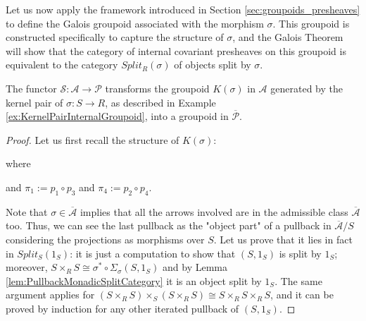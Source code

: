 Let us now apply the framework introduced in Section \ref{sec:groupoids_presheaves} to define the Galois groupoid associated with the morphism $\sigma$. This groupoid is constructed specifically to capture the structure of $\sigma$, and the Galois Theorem will show that the category of internal covariant presheaves on this groupoid is equivalent to the category $Split_R(\sigma)$ of objects split by $\sigma$.
\begin{lemma}
\label{lem:GaloisGroupoid}
    The functor $\mathcal{S}:\mathcal{A}\longrightarrow\mathcal{P}$ transforms the groupoid $K(\sigma)$ in $\mathcal{A}$ generated by the kernel pair of $\sigma:S\to R$, as described in Example \ref{ex:KernelPairInternalGroupoid}, into a groupoid in $\overline{\mathcal{P}}$.
    \begin{proof} Let us first recall the structure of $K(\sigma)$:
        \begin{center}
        \end{center}
        where 
        \begin{center}
        \end{center}
        and $\pi_1:=p_1\circ p_3$ and $\pi_4:=p_2\circ p_4$.

        Note that $\sigma\in\overline{\mathcal{A}}$ implies that all the arrows involved are in the admissible class $\overline{\mathcal{A}}$ too. Thus, we can see the last pullback as the "object part" of a pullback in $\overline{\mathcal{A}}/S$ considering the projections as morphisms over $S$. Let us prove that it lies in fact in $Split_S(1_S)$: it is just a computation to show that $(S,1_S)$ is split by $1_S$; moreover, $S\times_RS\cong\sigma^*\circ\Sigma_\sigma(S,1_S)$ and by Lemma \ref{lem:PullbackMonadicSplitCategory} it is an object split by $1_S$. The same argument applies for $(S\times_RS)\times_S (S\times_RS)\cong S\times_RS\times_RS$, and it can be proved by induction for any other iterated pullback of $(S,1_S)$.


\end{proof}
\end{lemma}
